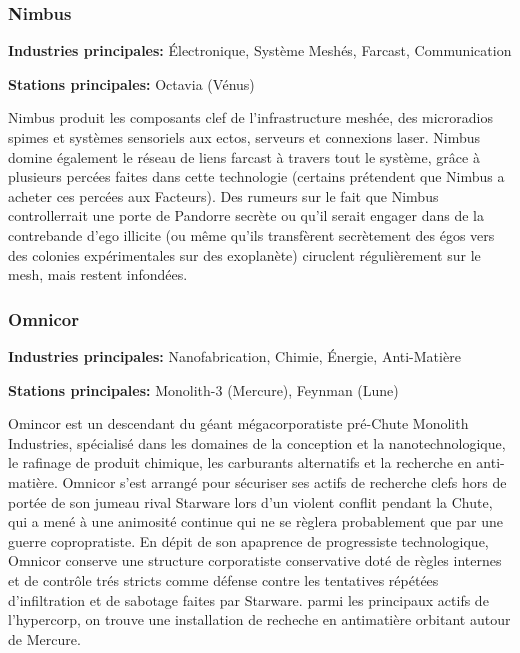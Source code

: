                      \subsubsection{Nimbus} \label{sec:nimbus} 

                     \textbf{Industries principales:} Électronique, Système Meshés, Farcast, Communication 

                     \textbf{Stations principales:} Octavia (Vénus) 

                     Nimbus produit les composants clef de l'infrastructure meshée, des microradios spimes et systèmes sensoriels aux ectos, serveurs et connexions laser. Nimbus domine également le réseau de liens farcast à travers tout le système, grâce à plusieurs percées faites dans cette technologie (certains prétendent que Nimbus a acheter ces percées aux Facteurs). Des rumeurs sur le fait que Nimbus controllerrait une porte de Pandorre secrète ou qu'il serait engager dans de la contrebande d'ego illicite (ou même qu'ils transfèrent secrètement des égos vers des colonies expérimentales sur des exoplanète) ciruclent régulièrement sur le mesh, mais restent infondées. 

                     \subsubsection{Omnicor} \label{sec:omnicor} 

                     \textbf{Industries principales:} Nanofabrication, Chimie, Énergie, Anti-Matière 

                     \textbf{Stations principales:} Monolith-3 (Mercure), Feynman (Lune) 

                     Omincor est un descendant du géant mégacorporatiste pré-Chute Monolith Industries, spécialisé dans les domaines de la conception et la nanotechnologique, le rafinage de produit chimique, les carburants alternatifs et la recherche en anti-matière. Omnicor s'est arrangé pour sécuriser ses actifs de recherche clefs hors de portée de son jumeau rival Starware lors d'un violent conflit pendant la Chute, qui a mené à une animosité continue qui ne se règlera probablement que par une guerre copropratiste. En dépit de son apaprence de progressiste technologique, Omnicor conserve une structure corporatiste conservative doté de règles internes et de contrôle trés stricts  comme défense contre les tentatives répétées d'infiltration et de sabotage faites par Starware. parmi les principaux actifs de l'hypercorp, on trouve une installation de recheche en antimatière orbitant autour de Mercure. 

